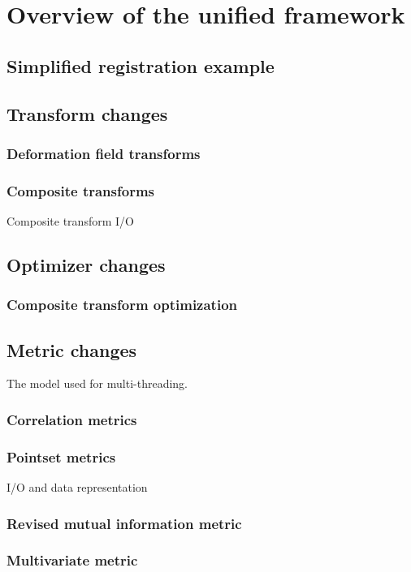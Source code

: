 \documentclass{llncs}
\begin{document}
\section{Overview of the unified framework}

\subsection{Simplified registration example}

\subsection{Transform changes}
\subsubsection{Deformation field transforms}
\subsubsection{Composite transforms}
Composite transform I/O

\subsection{Optimizer changes}
\subsubsection{Composite transform optimization}

\subsection{Metric changes}
The model used for multi-threading. 
\subsubsection{Correlation metrics}
\subsubsection{Pointset metrics}
I/O and data representation
\subsubsection{Revised mutual information metric}
\subsubsection{Multivariate metric}
\end{document}
